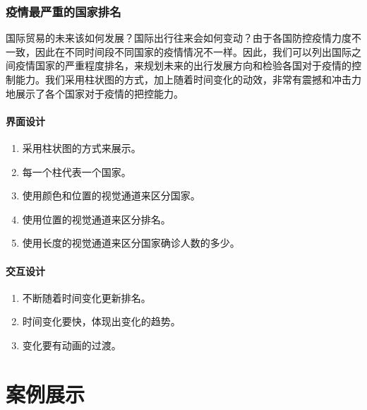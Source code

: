 \documentclass{ctexart}
\begin{document}
\subsubsection{疫情最严重的国家排名}
国际贸易的未来该如何发展？国际出行往来会如何变动？由于各国防控疫情力度不一致，因此在不同时间段不同国家的疫情情况不一样。因此，我们可以列出国际之间疫情国家的严重程度排名，来规划未来的出行发展方向和检验各国对于疫情的控制能力。我们采用柱状图的方式，加上随着时间变化的动效，非常有震撼和冲击力地展示了各个国家对于疫情的把控能力。
\paragraph{界面设计}
\begin{enumerate}
    \item 采用柱状图的方式来展示。
    \item 每一个柱代表一个国家。
    \item 使用颜色和位置的视觉通道来区分国家。
    \item 使用位置的视觉通道来区分排名。
    \item 使用长度的视觉通道来区分国家确诊人数的多少。
\end{enumerate}

\paragraph{交互设计}
\begin{enumerate}
\item 不断随着时间变化更新排名。
\item 时间变化要快，体现出变化的趋势。
\item 变化要有动画的过渡。
\end{enumerate}
\section{案例展示}
\end{document}
